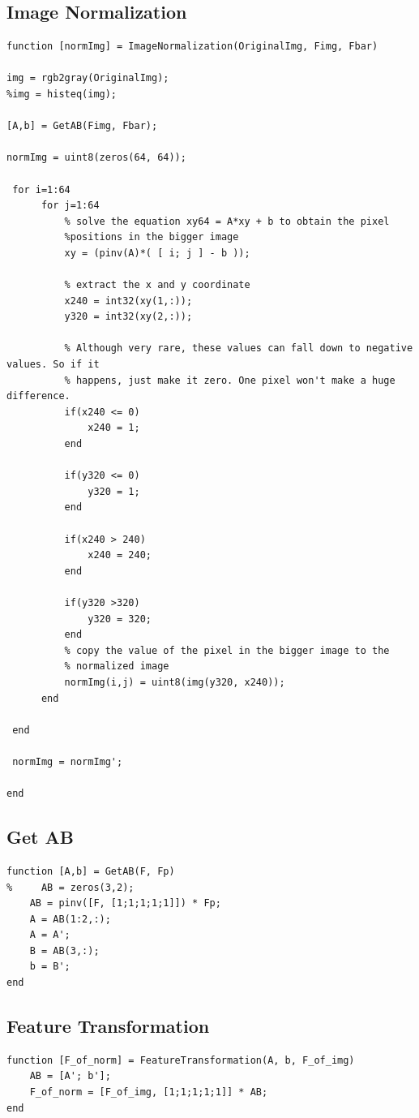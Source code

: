 \documentclass[]{article}
\begin{document}
\subsection*{Image Normalization}
\begin{verbatim}
function [normImg] = ImageNormalization(OriginalImg, Fimg, Fbar)

img = rgb2gray(OriginalImg);
%img = histeq(img);

[A,b] = GetAB(Fimg, Fbar);

normImg = uint8(zeros(64, 64));

 for i=1:64
      for j=1:64       
          % solve the equation xy64 = A*xy + b to obtain the pixel 
          %positions in the bigger image
          xy = (pinv(A)*( [ i; j ] - b ));
          
          % extract the x and y coordinate 
          x240 = int32(xy(1,:));
          y320 = int32(xy(2,:));
          
          % Although very rare, these values can fall down to negative values. So if it
          % happens, just make it zero. One pixel won't make a huge difference.
          if(x240 <= 0)
              x240 = 1;
          end
          
          if(y320 <= 0)
              y320 = 1;
          end
          
          if(x240 > 240)
              x240 = 240;
          end
          
          if(y320 >320)
              y320 = 320;
          end
          % copy the value of the pixel in the bigger image to the
          % normalized image
          normImg(i,j) = uint8(img(y320, x240));
      end
      
 end
 
 normImg = normImg';
 
end
\end{verbatim}

\subsection*{Get AB}
\begin{verbatim}
function [A,b] = GetAB(F, Fp)
%     AB = zeros(3,2);
    AB = pinv([F, [1;1;1;1;1]]) * Fp;
    A = AB(1:2,:);
    A = A';
    B = AB(3,:);
    b = B';
end
\end{verbatim}

\subsection*{Feature Transformation}
\begin{verbatim}
function [F_of_norm] = FeatureTransformation(A, b, F_of_img)
    AB = [A'; b'];
    F_of_norm = [F_of_img, [1;1;1;1;1]] * AB;
end
\end{verbatim}
\end{document}
